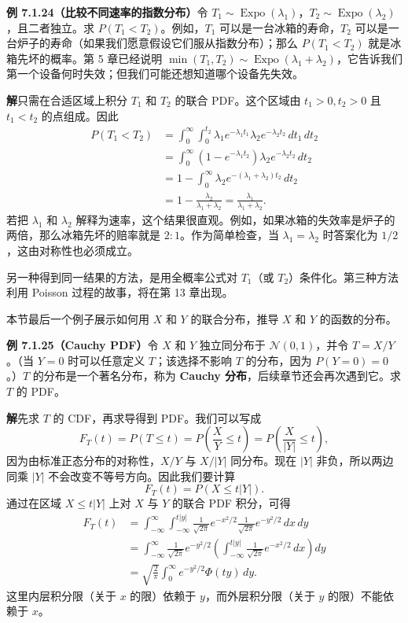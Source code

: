 \documentclass[UTF8, 12pt, fontset=fandol, oneside]{ctexart}
\begin{document}
\noindent\textbf{例 7.1.24（比较不同速率的指数分布）}\quad 令 $T_1\sim \operatorname{Expo}(\lambda_1)$，$T_2\sim \operatorname{Expo}(\lambda_2)$，且二者独立。求 $P(T_1<T_2)$。例如，$T_1$ 可以是一台冰箱的寿命，$T_2$ 可以是一台炉子的寿命（如果我们愿意假设它们服从指数分布）；那么 $P(T_1<T_2)$ 就是冰箱先坏的概率。第 5 章已经说明 $\min(T_1,T_2)\sim \operatorname{Expo}(\lambda_1+\lambda_2)$，它告诉我们第一个设备何时失效；但我们可能还想知道哪个设备先失效。

\noindent\textbf{解}\quad 只需在合适区域上积分 $T_1$ 和 $T_2$ 的联合 PDF。这个区域由 $t_1>0,t_2>0$ 且 $t_1<t_2$ 的点组成。因此
\[
\begin{aligned}
  P(T_1<T_2)
  &=\int_0^\infty\int_0^{t_2}\lambda_1 e^{-\lambda_1 t_1}\lambda_2 e^{-\lambda_2 t_2}\,dt_1\,dt_2\\
  &=\int_0^\infty (1-e^{-\lambda_1 t_2})\lambda_2 e^{-\lambda_2 t_2}\,dt_2\\
  &=1-\int_0^\infty \lambda_2 e^{-(\lambda_1+\lambda_2)t_2}\,dt_2\\
  &=1-\frac{\lambda_2}{\lambda_1+\lambda_2}
  =\frac{\lambda_1}{\lambda_1+\lambda_2}.
\end{aligned}
\]
若把 $\lambda_1$ 和 $\lambda_2$ 解释为速率，这个结果很直观。例如，如果冰箱的失效率是炉子的两倍，那么冰箱先坏的赔率就是 $2:1$。作为简单检查，当 $\lambda_1=\lambda_2$ 时答案化为 $1/2$，这由对称性也必须成立。

另一种得到同一结果的方法，是用全概率公式对 $T_1$（或 $T_2$）条件化。第三种方法利用 Poisson 过程的故事，将在第 13 章出现。

本节最后一个例子展示如何用 $X$ 和 $Y$ 的联合分布，推导 $X$ 和 $Y$ 的函数的分布。

\noindent\textbf{例 7.1.25（Cauchy PDF）}\quad 令 $X$ 和 $Y$ 独立同分布于 $\mathcal{N}(0,1)$，并令 $T=X/Y$。（当 $Y=0$ 时可以任意定义 $T$；该选择不影响 $T$ 的分布，因为 $P(Y=0)=0$。）$T$ 的分布是一个著名分布，称为 \textbf{Cauchy 分布}，后续章节还会再次遇到它。求 $T$ 的 PDF。

\noindent\textbf{解}\quad 先求 $T$ 的 CDF，再求导得到 PDF。我们可以写成
\[
  F_T(t)=P(T\le t)=P\left(\frac{X}{Y}\le t\right)
  =P\left(\frac{X}{|Y|}\le t\right),
\]
因为由标准正态分布的对称性，$X/Y$ 与 $X/|Y|$ 同分布。现在 $|Y|$ 非负，所以两边同乘 $|Y|$ 不会改变不等号方向。因此我们要计算
\[
  F_T(t)=P(X\le t|Y|).
\]
通过在区域 $X\le t|Y|$ 上对 $X$ 与 $Y$ 的联合 PDF 积分，可得
\[
\begin{aligned}
  F_T(t)
  &=\int_{-\infty}^{\infty}\int_{-\infty}^{t|y|}
    \frac{1}{\sqrt{2\pi}}e^{-x^2/2}\frac{1}{\sqrt{2\pi}}e^{-y^2/2}\,dx\,dy\\
  &=\int_{-\infty}^{\infty}\frac{1}{\sqrt{2\pi}}e^{-y^2/2}
    \left(\int_{-\infty}^{t|y|}\frac{1}{\sqrt{2\pi}}e^{-x^2/2}\,dx\right)dy\\
  &=\sqrt{\frac{2}{\pi}}\int_0^\infty e^{-y^2/2}\Phi(ty)\,dy.
\end{aligned}
\]
这里内层积分限（关于 $x$ 的限）依赖于 $y$，而外层积分限（关于 $y$ 的限）不能依赖于 $x$。
\end{document}
